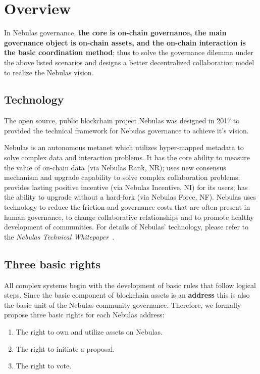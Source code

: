 \section{Overview}

In Nebulas governance, \textbf{the core is on-chain governance, the main governance object is on-chain assets, and the on-chain interaction is the basic coordination method}; thus to solve the governance dilemma under the above listed scenarios and designs a better decentralized collaboration model to realize the Nebulas vision.

\subsection{Technology}

The open source, public blockchain project Nebulas was designed in 2017 to provided the technical framework for Nebulas governance to achieve it's vision.

Nebulas is an autonomous metanet which utilizes hyper-mapped metadata to solve complex data and interaction problems. It has the core ability to measure the value of on-chain data (via Nebulas Rank, NR); uses new consensus mechanism and upgrade capability to solve complex collaboration problems; provides lasting positive incentive (via Nebulas Incentive, NI) for its users; has the ability to upgrade without a hard-fork (via Nebulas Force, NF). Nebulas uses technology to reduce the friction and governance costs that are often present in human governance, to change collaborative relationships and to promote healthy development of communities. For details of Nebulas' technology, please refer to the \textit{Nebulas Technical Whitepaper}~\cite{TechWhitepaper}.


\subsection{Three basic rights}
\label{rights}

All complex systems begin with the development of basic rules that follow logical steps. Since the basic component of blockchain assets is an \textbf{address} this is also the basic unit of the Nebulas community governance. Therefore, we formally propose three basic rights for each Nebulas address:

\begin{enumerate}
	\item The right to own and utilize assets on Nebulas.
	\item The right to initiate a proposal.
	\item The right to vote.
\end{enumerate}

